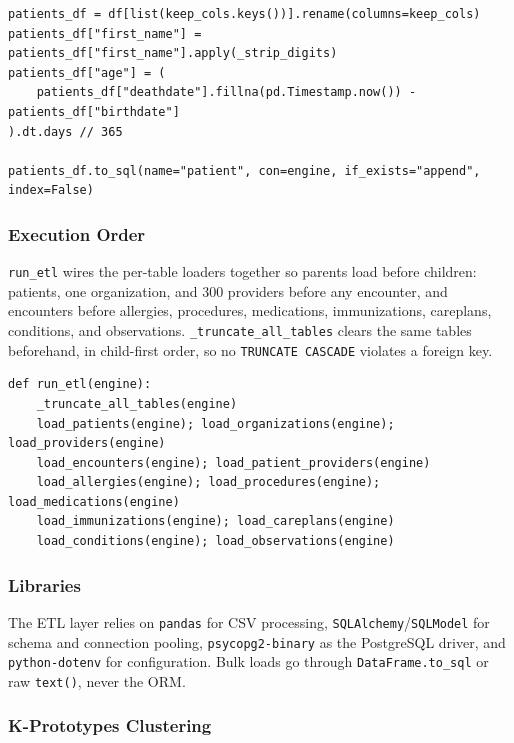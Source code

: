 \begin{lstlisting}[style=pythonstyle]
patients_df = df[list(keep_cols.keys())].rename(columns=keep_cols)
patients_df["first_name"] = patients_df["first_name"].apply(_strip_digits)
patients_df["age"] = (
    patients_df["deathdate"].fillna(pd.Timestamp.now()) - patients_df["birthdate"]
).dt.days // 365

patients_df.to_sql(name="patient", con=engine, if_exists="append", index=False)
\end{lstlisting}

\subsubsection*{Execution Order}

\texttt{run\_etl} wires the per-table loaders together so parents load before children: patients, one organization, and 300 providers before any encounter, and encounters before allergies, procedures, medications, immunizations, careplans, conditions, and observations. \texttt{\_truncate\_all\_tables} clears the same tables beforehand, in child-first order, so no \texttt{TRUNCATE CASCADE} violates a foreign key.

\begin{lstlisting}[style=pythonstyle]
def run_etl(engine):
    _truncate_all_tables(engine)
    load_patients(engine); load_organizations(engine); load_providers(engine)
    load_encounters(engine); load_patient_providers(engine)
    load_allergies(engine); load_procedures(engine); load_medications(engine)
    load_immunizations(engine); load_careplans(engine)
    load_conditions(engine); load_observations(engine)
\end{lstlisting}

\subsubsection*{Libraries}

The ETL layer relies on \texttt{pandas} for CSV processing, \texttt{SQLAlchemy}/\texttt{SQLModel} for schema and connection pooling, \texttt{psycopg2-binary} as the PostgreSQL driver, and \texttt{python-dotenv} for configuration. Bulk loads go through \texttt{DataFrame.to\_sql} or raw \texttt{text()}, never the ORM.

\subsubsection{K-Prototypes Clustering}
\label{ch:kproto_impl}

